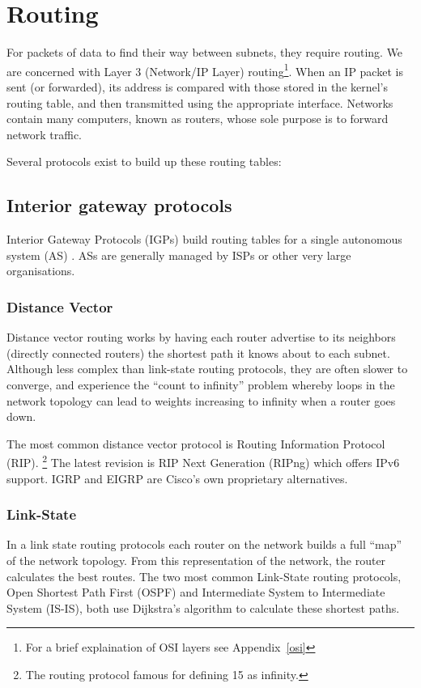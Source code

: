 \documentclass[12pt,a4paper,twoside]{report}
\begin{document}
\section{Routing}
For packets of data to find their way between subnets, they require routing.
We are concerned with Layer 3 (Network/IP Layer) routing\footnote{For a brief
explaination of OSI layers see Appendix~\ref{osi}}. When an IP packet is sent
(or forwarded), its address is compared with those stored in the kernel's
routing table, and then transmitted using the appropriate interface. Networks
contain many computers, known as routers, whose sole purpose is to forward
network traffic.

Several protocols exist to build up these routing tables:

\subsection{Interior gateway protocols}
Interior Gateway Protocols (IGPs)  build routing tables for a single autonomous system (AS)
. ASs are generally managed by ISPs or
other very large organisations.  

\subsubsection{Distance Vector}
Distance vector routing works by having each router advertise to its neighbors
(directly connected routers) the shortest path it knows about to each subnet.
Although less complex than link-state routing protocols, they are often slower
to converge, and experience the ``count to infinity'' problem whereby loops in
the network topology can lead to weights increasing to infinity when a router
goes down. 

The most common distance vector protocol is Routing Information Protocol (RIP).
 \footnote{The routing protocol
famous for defining 15 as infinity.} The latest revision is RIP Next Generation
(RIPng) which offers IPv6 support. IGRP and EIGRP are Cisco's own proprietary
alternatives.

\subsubsection{Link-State}
In a link state routing protocols each router on the network builds a full
``map'' of the network topology. From this representation of the network, the
router calculates the best routes. The two most common Link-State routing
protocols, Open Shortest Path First (OSPF)  and Intermediate System to Intermediate System (IS-IS),
 both use
Dijkstra's algorithm to calculate these shortest paths. 
\end{document}
